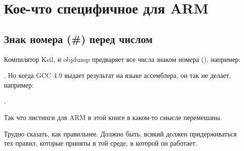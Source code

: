 ﻿\chapter{Кое-что специфичное для ARM}

\section{Знак номера (\#) перед числом}

Компилятор Keil, \IDA и objdump предваряет все числа знаком номера (\q{\#}), например:

.
Но когда GCC 4.9 выдает результат на языке ассемблера, он так не делает, например:

.

Так что листинги для ARM в этой книге в каком-то смысле перемешаны.

Трудно сказать, как правильнее.
Должно быть, всякий должен придерживаться тех правил, которые приняты в той среде, в которой он работает.




